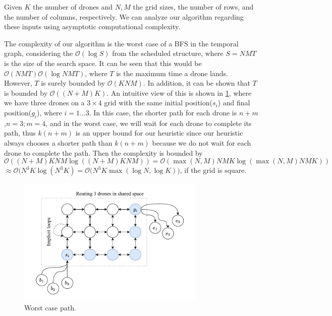 Given $K$ the number of drones and
$N, M$ the grid sizes, the number of rows, and the number of columns, respectively. We can analyze our algorithm regarding these inputs using asymptotic computational complexity.

The complexity of our algorithm is the worst case of a BFS in the temporal graph, considering the $\mathcal{O}(\log S)$ from the scheduled structure, where $S= N M T$ is the size of the search space. It can be seen that this would be $\mathcal{O}(N M T)\mathcal{O}(\log N M T)$, where $T$ is the maximum time a drone lands. However, $T$ is surely bounded by $\mathcal{O}(K N M)$. In addition, it can be shown that $T$ is bounded by $\mathcal{O}((N+M) K)$. An intuitive view of this is shown in \ref{fig:worst_path}, where we have three drones on a $3\times 4$ grid with the same initial position($s_i$) and final position($g_i$), where $i=1\dots3$. In this case, the shorter path for each drone is $n+m$,$n=3;m=4$, and in the worst case, we will wait for each drone to complete its path, thus $k(n+m)$ is an upper bound for our heuristic since our heuristic always chooses a shorter path than $k(n+m)$ because we do not wait for each drone to complete the path.   Then the complexity is bounded by $$\mathcal{O}((N+M) K N M \log((N+M) K N M))= \mathcal{O}(\max{(N,M)} N M K  \log(\max{(N,M)} N M K)) $$  $\approx \mathcal{O}(N^3  K \log(N^3 K) = \mathcal{O}(N^3  K \max{(\log N , \log K))} $, if the grid is square. 



\begin{figure}[H]
    \centering
    \includegraphics[width=0.8\textwidth]{img/worst_path.drawio.pdf}
    \caption{Worst case path.}
    \label{fig:worst_path}
\end{figure}
